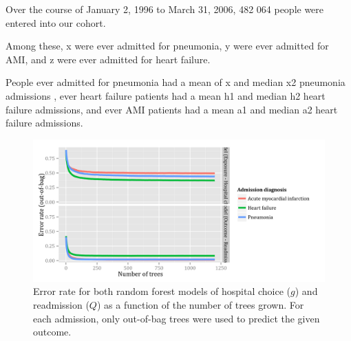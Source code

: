 \documentclass[]{article}\usepackage[]{graphicx}\usepackage[]{color}
\begin{document}


Over the course of January 2, 1996 to March 31, 2006, 482 064 people were entered into our cohort. 

Among these, x were ever admitted for pneumonia, y were ever admitted for AMI, and z were ever admitted for heart failure. 

People ever admitted for pneumonia had a mean of x and median x2 pneumonia admissions , ever heart failure patients had a mean h1 and median h2 heart failure admissions, and ever AMI patients had a mean a1 and median a2 heart failure admissions.

\begin{figure}[H]
    \includegraphics{../figures/error_rate_for_hospital_choice.png}
    \caption[Error rate for random forest model of hospital choice.]
      {Error rate for both random forest models of hospital choice ($g$) and readmission ($Q$) as a function of the number of trees grown. For each admission, only out-of-bag trees were used to predict the given outcome.}
    \label{fig:error_rate_for_hospital_choice}
\end{figure}
\end{document}
